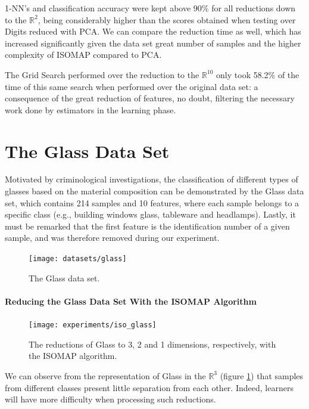 1-NN's and classification accuracy were kept above 90\% for all reductions down to the $\mathbb{R}^2$, being considerably higher than the scores obtained when testing over Digits reduced with PCA. We can compare the reduction time as well, which has increased significantly given the data set great number of samples and the higher complexity of ISOMAP compared to PCA.

The Grid Search performed over the reduction to the $\mathbb{R}^{10}$ only took 58.2\% of the time of this same search when performed over the original data set: a consequence of the great reduction of features, no doubt, filtering the necessary work done by estimators in the learning phase.

\clearpage
\section{The Glass Data Set}

Motivated by criminological investigations, the classification of different types of glasses based on the material composition can be demonstrated by the Glass data set, which contains 214 samples and 10 features, where each sample belongs to a specific class (e.g., building windows glass, tableware and headlamps). Lastly, it must be remarked that the first feature is the identification number of a given sample, and was therefore removed during our experiment.
\newline\newline

\begin{figure}[H]
	\centering
	\texttt{[image: datasets/glass]}
	\captionsetup{justification=centering}
	\caption{The Glass data set.}
\end{figure}

\newpage
\paragraph{Reducing the Glass Data Set With the ISOMAP Algorithm}

\begin{figure}[H]
	\centering
	\captionsetup{justification=centering}
	\texttt{[image: experiments/iso\_glass]}
	\caption{The reductions of Glass to 3, 2 and 1 dimensions, respectively, with the ISOMAP algorithm.}
	\label{fig:dsglassiso}
\end{figure}

We can observe from the representation of Glass in the $\mathbb{R}^3$ (figure \ref{fig:dsglassiso}) that samples from different classes present little separation from each other. Indeed, learners will have more difficulty when processing such reductions.

